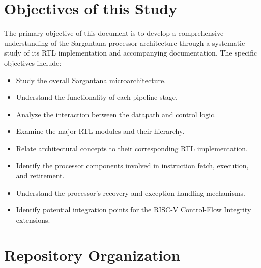 \section{Objectives of this Study}

The primary objective of this document is to develop a comprehensive understanding of the
Sargantana processor architecture through a systematic study of its RTL implementation and
accompanying documentation. The specific objectives include:

\begin{itemize}
  \item Study the overall Sargantana microarchitecture.
  \item Understand the functionality of each pipeline stage.
  \item Analyze the interaction between the datapath and control logic.
  \item Examine the major RTL modules and their hierarchy.
  \item Relate architectural concepts to their corresponding RTL implementation.
  \item Identify the processor components involved in instruction fetch, execution, and
        retirement.
  \item Understand the processor's recovery and exception handling mechanisms.
  \item Identify potential integration points for the RISC-V Control-Flow Integrity extensions.
\end{itemize}

\section{Repository Organization}

